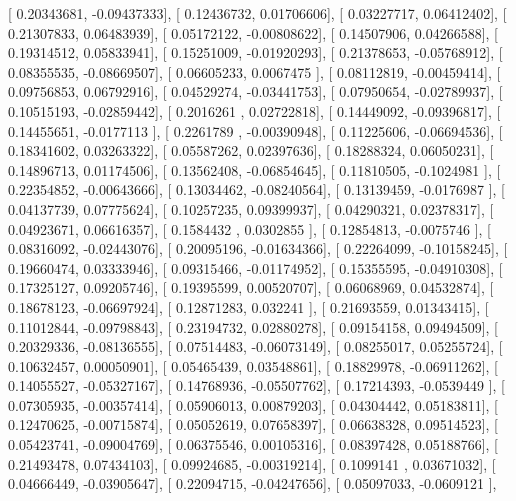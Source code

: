 \documentclass{article}
\begin{document}
       [ 0.20343681, -0.09437333],
       [ 0.12436732,  0.01706606],
       [ 0.03227717,  0.06412402],
       [ 0.21307833,  0.06483939],
       [ 0.05172122, -0.00808622],
       [ 0.14507906,  0.04266588],
       [ 0.19314512,  0.05833941],
       [ 0.15251009, -0.01920293],
       [ 0.21378653, -0.05768912],
       [ 0.08355535, -0.08669507],
       [ 0.06605233,  0.0067475 ],
       [ 0.08112819, -0.00459414],
       [ 0.09756853,  0.06792916],
       [ 0.04529274, -0.03441753],
       [ 0.07950654, -0.02789937],
       [ 0.10515193, -0.02859442],
       [ 0.2016261 ,  0.02722818],
       [ 0.14449092, -0.09396817],
       [ 0.14455651, -0.0177113 ],
       [ 0.2261789 , -0.00390948],
       [ 0.11225606, -0.06694536],
       [ 0.18341602,  0.03263322],
       [ 0.05587262,  0.02397636],
       [ 0.18288324,  0.06050231],
       [ 0.14896713,  0.01174506],
       [ 0.13562408, -0.06854645],
       [ 0.11810505, -0.1024981 ],
       [ 0.22354852, -0.00643666],
       [ 0.13034462, -0.08240564],
       [ 0.13139459, -0.0176987 ],
       [ 0.04137739,  0.07775624],
       [ 0.10257235,  0.09399937],
       [ 0.04290321,  0.02378317],
       [ 0.04923671,  0.06616357],
       [ 0.1584432 ,  0.0302855 ],
       [ 0.12854813, -0.0075746 ],
       [ 0.08316092, -0.02443076],
       [ 0.20095196, -0.01634366],
       [ 0.22264099, -0.10158245],
       [ 0.19660474,  0.03333946],
       [ 0.09315466, -0.01174952],
       [ 0.15355595, -0.04910308],
       [ 0.17325127,  0.09205746],
       [ 0.19395599,  0.00520707],
       [ 0.06068969,  0.04532874],
       [ 0.18678123, -0.06697924],
       [ 0.12871283,  0.032241  ],
       [ 0.21693559,  0.01343415],
       [ 0.11012844, -0.09798843],
       [ 0.23194732,  0.02880278],
       [ 0.09154158,  0.09494509],
       [ 0.20329336, -0.08136555],
       [ 0.07514483, -0.06073149],
       [ 0.08255017,  0.05255724],
       [ 0.10632457,  0.00050901],
       [ 0.05465439,  0.03548861],
       [ 0.18829978, -0.06911262],
       [ 0.14055527, -0.05327167],
       [ 0.14768936, -0.05507762],
       [ 0.17214393, -0.0539449 ],
       [ 0.07305935, -0.00357414],
       [ 0.05906013,  0.00879203],
       [ 0.04304442,  0.05183811],
       [ 0.12470625, -0.00715874],
       [ 0.05052619,  0.07658397],
       [ 0.06638328,  0.09514523],
       [ 0.05423741, -0.09004769],
       [ 0.06375546,  0.00105316],
       [ 0.08397428,  0.05188766],
       [ 0.21493478,  0.07434103],
       [ 0.09924685, -0.00319214],
       [ 0.1099141 ,  0.03671032],
       [ 0.04666449, -0.03905647],
       [ 0.22094715, -0.04247656],
       [ 0.05097033, -0.0609121 ],
\end{document}
